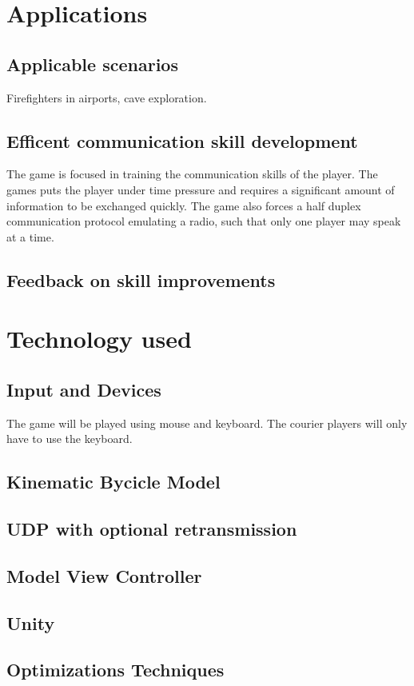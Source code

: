 \documentclass{article}
\begin{document}
\clearpage

\section{Applications}
\subsection{Applicable scenarios}
Firefighters in airports, cave exploration.
\subsection{Efficent communication skill development}
The game is focused in training the communication skills of the player. The games puts the player under time pressure and requires a significant amount of information to be exchanged quickly. The game also forces a half duplex communication protocol emulating a radio, such that only one player may speak at a time.
\subsection{Feedback on skill improvements}

\clearpage

\section{Technology used}
\subsection{Input and Devices}
The game will be played using mouse and keyboard. The courier players will only have to use the keyboard.
\subsection{Kinematic Bycicle Model}
\subsection{UDP with optional retransmission}
\subsection{Model View Controller}
\subsection{Unity}
\subsection{Optimizations Techniques}
\end{document}
